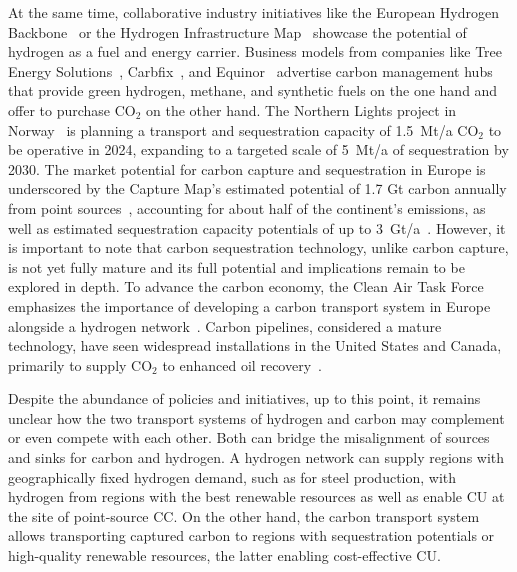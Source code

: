 \documentclass[twocolumn]{article}
\newcommand{\carbon}{CO$_2$}
\begin{document}
At the same time, collaborative industry initiatives like the European Hydrogen Backbone~\cite{gasforclimateEuropeanHydrogenBackbone2022} or the Hydrogen Infrastructure Map~\cite{H2InfrastructureMap} showcase the potential of hydrogen as a fuel and energy carrier.
Business models from companies like Tree Energy Solutions~\cite{TESHydrogenLife2023}, Carbfix~\cite{WeTurnCO2}, and Equinor~\cite{adomaitisEquinorRWEBuild2023} advertise carbon management hubs that provide green hydrogen, methane, and synthetic fuels on the one hand and offer to purchase \carbon{} on the other hand. The Northern Lights project in Norway~\cite{NorthernLightsWhat} is planning a transport and sequestration capacity of 1.5~Mt/a \carbon{} to be operative in 2024, expanding to a targeted scale of 5~Mt/a of sequestration by 2030.
The market potential for carbon capture and sequestration in Europe is underscored by the Capture Map's estimated potential of 1.7 Gt carbon annually from point sources~\cite{ToolsGreenTransition}, accounting for about half of the continent's emissions, as well as estimated sequestration capacity potentials of up to 3~Gt/a~\cite{europeancommissionEuropeanCO2Storage}. However, it is important to note that carbon sequestration technology, unlike carbon capture, is not yet fully mature and its full potential and implications remain to be explored in depth.
To advance the carbon economy, the Clean Air Task Force emphasizes the importance of developing a carbon transport system in Europe alongside a hydrogen network~\cite{lockwoodEuropeanStrategyCarbon}. Carbon pipelines, considered a mature technology, have seen widespread installations in the United States and Canada, primarily to supply \carbon{} to enhanced oil recovery~\cite{righettiSitingCarbonDioxide2017,friedmann2020net}.

Despite the abundance of policies and initiatives, up to this point, it remains unclear how the two transport systems of hydrogen and carbon may complement or even compete with each other. Both can bridge the misalignment of sources and sinks for carbon and hydrogen. A hydrogen network can supply regions with geographically fixed hydrogen demand, such as for steel production, with hydrogen from regions with the best renewable resources as well as enable CU at the site of point-source CC. On the other hand, the carbon transport system allows transporting captured carbon to regions with sequestration potentials or high-quality renewable resources, the latter enabling cost-effective CU.\@
\end{document}
